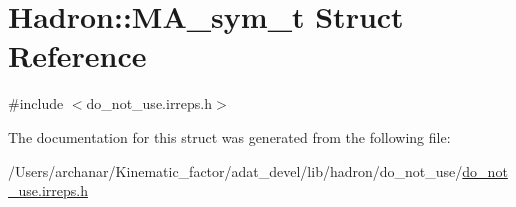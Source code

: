 \hypertarget{structHadron_1_1MA__sym__t}{}\section{Hadron\+:\+:M\+A\+\_\+sym\+\_\+t Struct Reference}
\label{structHadron_1_1MA__sym__t}


{\ttfamily \#include $<$do\+\_\+not\+\_\+use.\+irreps.\+h$>$}



The documentation for this struct was generated from the following file\+:\begin{DoxyCompactItemize}
\item 
/\+Users/archanar/\+Kinematic\+\_\+factor/adat\+\_\+devel/lib/hadron/do\+\_\+not\+\_\+use/\mbox{\hyperlink{do__not__use_8irreps_8h}{do\+\_\+not\+\_\+use.\+irreps.\+h}}\end{DoxyCompactItemize}
